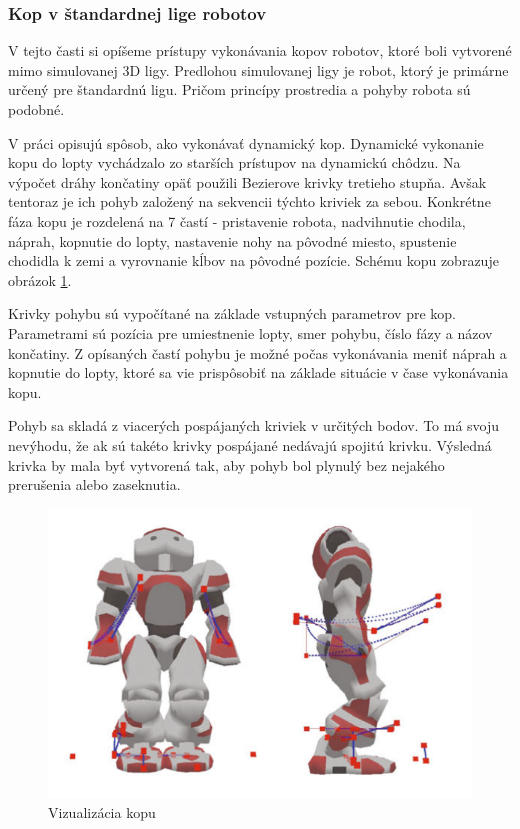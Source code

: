 \subsubsection{Kop v štandardnej lige robotov}\label{sec_bremen}
V tejto časti si opíšeme prístupy vykonávania kopov robotov, ktoré boli vytvorené mimo simulovanej 3D ligy. Predlohou simulovanej ligy je robot, ktorý je primárne určený pre štandardnú ligu. Pričom princípy prostredia a pohyby robota sú podobné. 

V práci \cite{bremen} opisujú spôsob, ako vykonávať dynamický kop. Dynamické vykonanie kopu do lopty vychádzalo zo starších prístupov na dynamickú chôdzu. Na výpočet dráhy končatiny opäť použili Bezierove krivky tretieho stupňa. Avšak tentoraz je ich pohyb založený na sekvencii týchto kriviek za sebou. Konkrétne fáza kopu je rozdelená na 7 častí - pristavenie robota, nadvihnutie chodila, náprah, kopnutie do lopty, nastavenie nohy na pôvodné miesto, spustenie chodidla k zemi a vyrovnanie kĺbov na pôvodné pozície. Schému kopu zobrazuje obrázok \ref{pic_kick_arch_bremen}. 

Krivky pohybu sú vypočítané na základe vstupných parametrov pre kop. Parametrami sú pozícia pre umiestnenie lopty, smer pohybu, číslo fázy a názov končatiny. Z opísaných častí pohybu je možné počas vykonávania meniť náprah a kopnutie do lopty, ktoré sa vie prispôsobiť na základe situácie v čase vykonávania kopu.

Pohyb sa skladá z viacerých pospájaných kriviek v určitých bodov. To má svoju nevýhodu, že ak sú takéto krivky pospájané nedávajú spojitú krivku. Výsledná krivka by mala byť vytvorená tak, aby pohyb bol plynulý bez nejakého prerušenia alebo zaseknutia. 

\begin{figure}[H]
	\center
	\includegraphics[scale=1]{./data/kick_arch_bremen}
	\caption{Vizualizácia kopu \cite{bremen}}
	\label{pic_kick_arch_bremen}
\end{figure}

